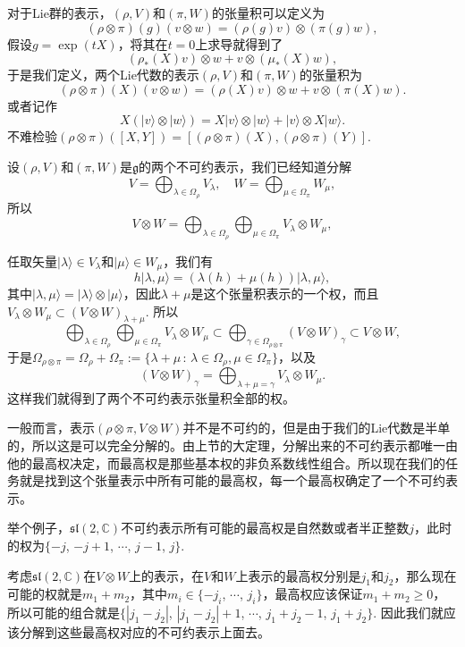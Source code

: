 \documentclass[9pt]{extarticle}
\newcommand{\cc}{\mathbb{C}}
\newcommand{\lag}{{\mathfrak{g}}}
\begin{document}
对于Lie群的表示，$(\rho,V)$和$(\pi,W)$的张量积可以定义为
\[
	(\rho\otimes\pi)(g)(v\otimes w)=(\rho(g)v)\otimes(\pi(g)w),
\]
假设$g=\exp(tX)$，将其在$t=0$上求导就得到了
\[
	(\rho_*(X)v)\otimes w+ v \otimes (\mu_*(X)w),
\]
于是我们定义，两个Lie代数的表示$(\rho,V)$和$(\pi,W)$的张量积为
\[
	(\rho\otimes\pi)(X)(v\otimes w)=(\rho(X)v)\otimes w+ v \otimes (\pi(X)w).
\]
或者记作
\[
	X(|v\rangle\otimes|w\rangle)=X|v\rangle\otimes|w\rangle+|v\rangle\otimes X|w\rangle.
\]
不难检验$(\rho\otimes\pi)([X,Y])=[(\rho\otimes\pi)(X),(\rho\otimes\pi)(Y)]$.

\para 设$(\rho,V)$和$(\pi,W)$是$\lag$的两个不可约表示，我们已经知道分解
\[
	V=\bigoplus_{\lambda\in\Omega_\rho} V_\lambda,\quad W=\bigoplus_{\mu\in\Omega_\pi} W_\mu,
\]
所以
\[
	V\otimes W=\bigoplus_{\lambda\in\Omega_\rho}\bigoplus_{\mu\in\Omega_\pi} V_\lambda\otimes W_\mu,
\]

任取矢量$|\lambda\rangle\in V_\lambda$和$|\mu\rangle\in W_\mu$，我们有
\[
	h|\lambda,\mu\rangle=(\lambda(h)+\mu(h))|\lambda,\mu\rangle,
\]
其中$|\lambda,\mu\rangle=|\lambda\rangle\otimes |\mu\rangle$，因此$\lambda+\mu$是这个张量积表示的一个权，而且$V_\lambda\otimes W_\mu \subset (V\otimes W)_{\lambda+\mu}$. 所以
\[
	\bigoplus_{\lambda\in\Omega_\rho}\bigoplus_{\mu\in\Omega_\pi} V_\lambda\otimes W_\mu\subset \bigoplus_{\gamma\in \Omega_{\rho\otimes\pi}} (V\otimes W)_{\gamma}\subset V\otimes W,
\]
于是$\Omega_{\rho\otimes\pi}=\Omega_{\rho}+\Omega_{\pi}:=\{\lambda+\mu\,:\,\lambda\in\Omega_\rho,\mu\in\Omega_\pi\}$，以及
\[
	(V\otimes W)_{\gamma}=\bigoplus_{\lambda+\mu=\gamma}V_\lambda\otimes W_\mu.
\]
这样我们就得到了两个不可约表示张量积全部的权。

\para 一般而言，表示$(\rho\otimes\pi,V\otimes W)$并不是不可约的，但是由于我们的Lie代数是半单的，所以这是可以完全分解的。由上节的大定理，分解出来的不可约表示都唯一由他的最高权决定，而最高权是那些基本权的非负系数线性组合。所以现在我们的任务就是找到这个张量表示中所有可能的最高权，每一个最高权确定了一个不可约表示。

举个例子，$\mathfrak{sl}(2,\cc)$不可约表示所有可能的最高权是自然数或者半正整数$j$，此时的权为$\{-j$, $-j+1$, $\cdots$, $j-1$, $j\}$.

考虑$\mathfrak{sl}(2,\cc)$在$V\otimes W$上的表示，在$V$和$W$上表示的最高权分别是$j_1$和$j_2$，那么现在可能的权就是$m_1+m_2$，其中$m_i\in\{-j_i$, $\cdots$, $j_i\}$，最高权应该保证$m_1+m_2\geq 0$，所以可能的组合就是$\{|j_1-j_2|$, $|j_1-j_2|+1$, $\cdots$, $j_1+j_2-1$, $j_1+j_2\}$. 因此我们就应该分解到这些最高权对应的不可约表示上面去。
\end{document}
